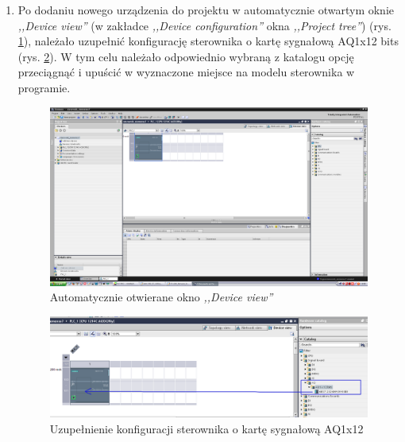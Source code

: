 \documentclass[12pt]{article}
\begin{document}
\begin{enumerate}
    \item Po dodaniu nowego urządzenia do projektu w automatycznie otwartym oknie \textit{,,Device view''} (w zakładce \textit{,,Device configuration''} okna \textit{,,Project tree''}) (rys. \ref{device view}), należało uzupełnić konfigurację sterownika o kartę sygnałową AQ1x12 bits (rys. \ref{aq1}). W tym celu należało odpowiednio wybraną z katalogu opcję przeciągnąć i upuścić w wyznaczone miejsce na modelu sterownika w programie.
    \begin{figure}[H]
        \centering
        \includegraphics[scale=0.25]{./zdj/wstep.png}
        \caption{Automatycznie otwierane okno \textit{,,Device view''}}
        \label{device view}
    \end{figure}
    \begin{figure}[H]
        \centering
        \includegraphics[scale=0.35]{./zdj/aq1_ok.png}
        \caption{Uzupełnienie konfiguracji sterownika o kartę sygnałową AQ1x12 }
        \label{aq1}
    \end{figure}


\end{enumerate}
\end{document}
